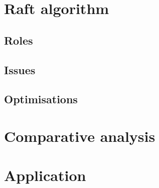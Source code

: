 \documentclass[12pt, a4paper]{article}
\begin{document}
\section{Raft algorithm}

\subsection{Roles}

\subsection{Issues}

\subsection{Optimisations}


\section{Comparative analysis}


\section{Application}






\end{document}
